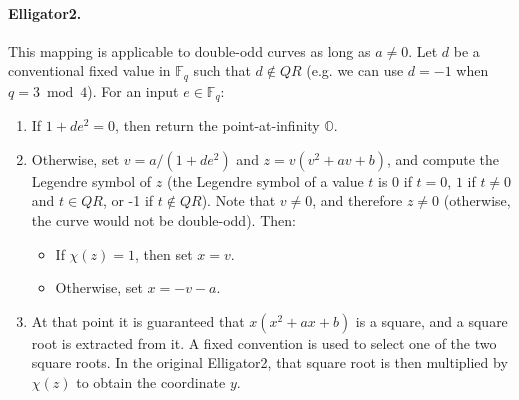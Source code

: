 \documentclass{llncs}
\newcommand{\QR}{QR}
\newcommand{\bF}{\mathbb{F}}
\newcommand{\neutral}{\mathbb{O}}
\begin{document}
\paragraph{Elligator2.} This mapping is applicable to double-odd curves
as long as $a \neq 0$. Let $d$ be a conventional fixed value in $\bF_q$
such that $d \notin \QR$ (e.g. we can use $d = -1$ when $q = 3 \bmod 4$).
For an input $e \in \bF_q$:
\begin{enumerate}

    \item If $1 + de^2 = 0$, then return the point-at-infinity $\neutral$.

    \item Otherwise, set $v = a/(1 + de^2)$ and $z = v(v^2 + av + b)$,
    and compute the Legendre symbol of $z$ (the Legendre symbol of a value
    $t$ is $0$ if $t = 0$, $1$ if $t\neq 0$ and $t \in \QR$, or -1 if $t
    \notin \QR$). Note that $v\neq 0$, and therefore $z\neq 0$ (otherwise,
    the curve would not be double-odd). Then:
    \begin{itemize}
        \item If $\chi(z) = 1$, then set $x = v$.
        \item Otherwise, set $x = -v - a$.
    \end{itemize}

    \item At that point it is guaranteed that $x(x^2 + ax + b)$ is a
    square, and a square root is extracted from it. A fixed convention
    is used to select one of the two square roots. In the original
    Elligator2, that square root is then multiplied by $\chi(z)$ to
    obtain the coordinate $y$.

\end{enumerate}
\end{document}

